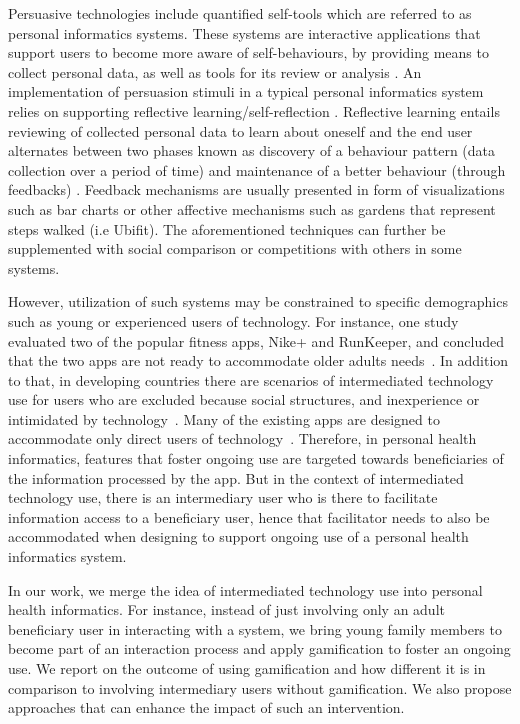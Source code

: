 \documentclass{sig-alternate}
\begin{document}
Persuasive technologies include quantified self-tools which are referred to as personal informatics systems. These systems are interactive applications that support users to become more aware of self-behaviours, by providing means to collect personal data, as well as tools for its review or analysis \cite{li2011:personal,li2012:personal}. An implementation of persuasion stimuli in a typical personal informatics system relies on supporting reflective learning/self-reflection \cite{li2011:understanding}. Reflective learning entails reviewing of collected personal data to learn about oneself and the end user alternates between two phases known as discovery of a behaviour pattern (data collection over a period of time) and maintenance of a better behaviour (through feedbacks) \cite{li2011:understanding}. Feedback mechanisms are usually presented in form of visualizations such as bar charts or other affective mechanisms such as gardens that represent steps walked (i.e Ubifit\cite{klasnja2009:using}). The aforementioned techniques can further be supplemented with social comparison\cite{Oinas-kukkonen:psd} or competitions with others\cite{comber2013:designing} in some systems.

However, utilization of such systems may be constrained to specific demographics such as young or experienced users of technology. For instance, one study evaluated two of the popular fitness apps, Nike+ and RunKeeper, and concluded that the two apps are not ready to accommodate older adults needs~\cite{silva2014:smartphones}. In addition to that, in developing countries there are scenarios of intermediated technology use for users who are excluded because social structures, and  inexperience or intimidated by technology~\cite{sambasivan2010,kumar2015mobile}. Many of the existing apps are designed to accommodate only direct users of technology~\cite{sambasivan2010}. Therefore, in personal health informatics, features that foster ongoing use are targeted towards beneficiaries of the information processed by the app. But in the context of intermediated technology use, there is an intermediary user who is there to facilitate information access to a beneficiary user, hence that facilitator needs to also be accommodated when designing to support ongoing use of a personal health informatics system.

In our work, we merge the idea of intermediated technology use into personal health informatics. For instance, instead of just involving only an adult beneficiary user in interacting with a system, we bring young family members to become part of an interaction process and apply gamification to foster an ongoing use. We report on the outcome of using gamification and how different it is in comparison to involving intermediary users without gamification. We also propose approaches that can enhance the impact of such an intervention. 
\end{document}

